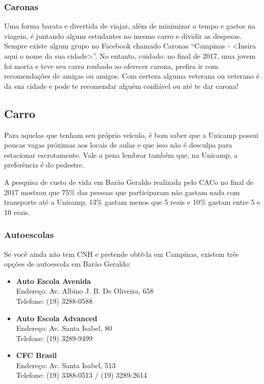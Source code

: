 \subsubsection{Caronas}

Uma forma barata e divertida de viajar, além de minimizar o tempo e gastos na
viagem, é juntando alguns estudantes no mesmo carro e dividir as despesas.
Sempre existe algum grupo no Facebook chamado Caronas ``Campinas - <Insira aqui
o nome da sua cidade>''. No entanto, cuidado: no final de 2017, uma jovem foi
morta e teve seu carro roubado ao oferecer carona, prefira ir com recomendações
de amigas ou amigos. Com certeza alguma veterana ou veterano é da sua cidade e
pode te recomendar alguém confiável ou até te dar carona!

\subsection{Carro}

Para aquelas que tenham seu próprio veículo, é bom saber que a Unicamp possui
poucas vagas próximas aos locais de aulas e que isso não é desculpa para
estacionar escrotamente. Vale a pena lembrar também que, na Unicamp, a
preferência é do pedestre.

A pesquisa de custo de vida em Barão Geraldo realizada pelo CACo no final de
2017 mostrou que 75\% das pessoas que participaram não gastam nada com
transporte até a Unicamp, 13\% gastam menos que 5 reais e 10\% gastam entre 5 e
10 reais.

\subsubsection{Autoescolas}

Se você ainda não tem CNH e pretende obtê-la em Campinas, existem três opções
de autoescola em Barão Geraldo:

\begin{itemize}
\item \textbf{Auto Escola Avenida}
  \\Endereço: Av. Albino J. B. De Oliveira, 658
  \\Telefone: (19) 3288-0588

\item \textbf{Auto Escola Advanced}
  \\Endereço: Av. Santa Isabel, 80
  \\Telefone: (19) 3289-9499

\item \textbf{CFC Brasil}
  \\Endereço: Av. Santa Isabel, 513
  \\Telefone: (19) 3388-0513 / (19) 3289-2614
\end{itemize}

